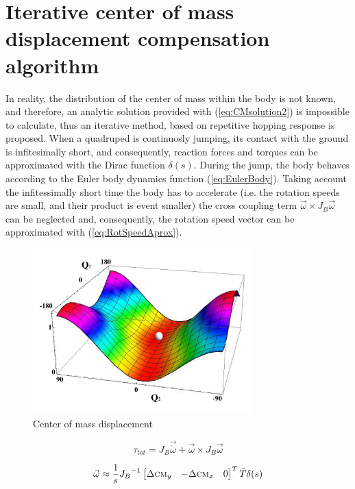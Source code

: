 \section{Iterative center of mass displacement compensation algorithm}\label{sec:Algorithm}
In reality, the distribution of the center of mass within the body is not known, and therefore, an analytic solution provided with (\ref{eq:CMsolution2}) is impossible to calculate, thus an iterative method, based on repetitive hopping response is proposed. When a quadruped is continuosly jumping, its contact with the ground is infitesimally short, and consequently, reaction forces and torques can be approximated with the Dirac function $\delta (s)$. During the jump, the body behaves according to the Euler body dynamics function (\ref{eq:EulerBody}). Taking account the infitessimally short time the body has to accelerate (i.e. the rotation speeds are small, and their product is event smaller) the cross coupling term $\vec{\omega}\times J_B\vec{\omega}$ can be neglected and, consequently, the rotation speed vector can be approximated with (\ref{eq:RotSpeedAprox}).
\begin{figure}
	\centering
	\includegraphics[width=85mm]{./pictures/RobinRepicCM.pdf}
	\caption{Center of mass displacement}
	\label{fig:CM3Dfunction}
\end{figure}

\begin{equation}\label{eq:EulerBody}
\tau_{tot}=J_B\vec{\dot{\omega}}+\vec{\omega}\times J_B\vec{\omega}
\end{equation}

\begin{equation}\label{eq:RotSpeedAprox}
\vec{\omega}\approx \frac{1}{s}{J_B}^{-1}\begin{bmatrix}
\Delta \textsc{cm}_y & -\Delta \textsc{cm}_x & 0
\end{bmatrix}^T\bar{T}\delta(s)
\end{equation}


